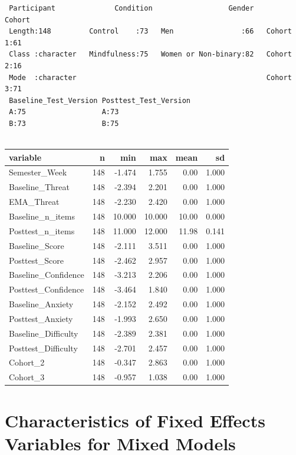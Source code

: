 \documentclass[
  letterpaper,
  DIV=11,
  numbers=noendperiod]{scrreprt}
\begin{document}
\begin{verbatim}
 Participant              Condition                  Gender        Cohort  
 Length:148         Control    :73   Men                :66   Cohort 1:61  
 Class :character   Mindfulness:75   Women or Non-binary:82   Cohort 2:16  
 Mode  :character                                             Cohort 3:71  
 Baseline_Test_Version Posttest_Test_Version
 A:75                  A:73                 
 B:73                  B:75                 
                                            
\end{verbatim}

\begin{longtable}[]{@{}lrrrrr@{}}
\toprule\noalign{}
variable & n & min & max & mean & sd \\
\midrule\noalign{}
\endhead
\bottomrule\noalign{}
\endlastfoot
Semester\_Week & 148 & -1.474 & 1.755 & 0.00 & 1.000 \\
Baseline\_Threat & 148 & -2.394 & 2.201 & 0.00 & 1.000 \\
EMA\_Threat & 148 & -2.230 & 2.420 & 0.00 & 1.000 \\
Baseline\_n\_items & 148 & 10.000 & 10.000 & 10.00 & 0.000 \\
Posttest\_n\_items & 148 & 11.000 & 12.000 & 11.98 & 0.141 \\
Baseline\_Score & 148 & -2.111 & 3.511 & 0.00 & 1.000 \\
Posttest\_Score & 148 & -2.462 & 2.957 & 0.00 & 1.000 \\
Baseline\_Confidence & 148 & -3.213 & 2.206 & 0.00 & 1.000 \\
Posttest\_Confidence & 148 & -3.464 & 1.840 & 0.00 & 1.000 \\
Baseline\_Anxiety & 148 & -2.152 & 2.492 & 0.00 & 1.000 \\
Posttest\_Anxiety & 148 & -1.993 & 2.650 & 0.00 & 1.000 \\
Baseline\_Difficulty & 148 & -2.389 & 2.381 & 0.00 & 1.000 \\
Posttest\_Difficulty & 148 & -2.701 & 2.457 & 0.00 & 1.000 \\
Cohort\_2 & 148 & -0.347 & 2.863 & 0.00 & 1.000 \\
Cohort\_3 & 148 & -0.957 & 1.038 & 0.00 & 1.000 \\
\end{longtable}

\chapter{Characteristics of Fixed Effects Variables for Mixed
Models}\label{characteristics-of-fixed-effects-variables-for-mixed-models}
\end{document}
